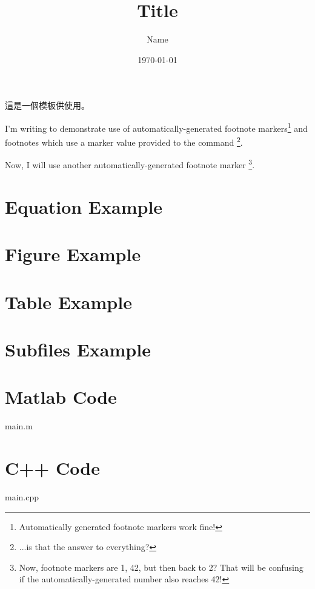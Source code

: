 \documentclass[a4paper]{article}
\title{Title}
\author{Name}
\date{\today}
\begin{document}





這是一個模板供使用。

I'm writing to demonstrate use of automatically-generated footnote markers\footnote{Automatically generated footnote markers work fine!} and footnotes which use a marker value provided to the command
\footnote[42]{...is that the answer to everything?}.

Now, I will use another automatically-generated footnote marker
\footnote{Now, footnote markers are 1, 42, but then back to 2? That will be confusing if the automatically-generated number also reaches 42!}.

\section{Equation Example}



\section{Figure Example}




\section{Table Example}



\section{Subfiles Example}



\appendix

\section{Matlab Code}
\begin{lstinputlisting}[style=Matlab]{main.m}
\end{lstinputlisting}

\section{C++ Code}
\begin{lstinputlisting}[style=C++]{main.cpp}
\end{lstinputlisting}
\end{document}
